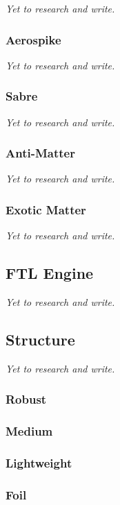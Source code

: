 \textit{Yet to research and write.}

\subsubsection{Aerospike}

\textit{Yet to research and write.}

\subsubsection{Sabre}

\textit{Yet to research and write.}

\subsubsection{Anti-Matter}

\textit{Yet to research and write.}

\subsubsection{Exotic Matter}

\textit{Yet to research and write.}

\subsection{FTL Engine}

\textit{Yet to research and write.}

\subsection{Structure}

\textit{Yet to research and write.}

\subsubsection{Robust}

\subsubsection{Medium}

\subsubsection{Lightweight}

\subsubsection{Foil}

